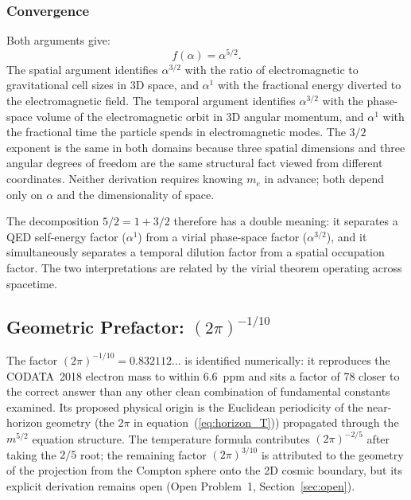 \documentclass[12pt,a4paper]{article}
\begin{document}
\subsubsection*{Convergence}

Both arguments give:
\begin{equation}
\boxed{f(\alpha) = \alpha^{5/2}.}
\label{eq:alpha}
\end{equation}
The spatial argument identifies $\alpha^{3/2}$ with the ratio of electromagnetic
to gravitational cell sizes in 3D space, and $\alpha^1$ with the fractional
energy diverted to the electromagnetic field. The temporal argument identifies
$\alpha^{3/2}$ with the phase-space volume of the electromagnetic orbit in
3D angular momentum, and $\alpha^1$ with the fractional time the particle spends
in electromagnetic modes. The $3/2$ exponent is the same in both domains because
three spatial dimensions and three angular degrees of freedom are the same
structural fact viewed from different coordinates. Neither derivation requires
knowing $m_e$ in advance; both depend only on $\alpha$ and the dimensionality
of space.

The decomposition $5/2 = 1 + 3/2$ therefore has a double meaning: it separates
a QED self-energy factor ($\alpha^1$) from a virial phase-space factor
($\alpha^{3/2}$), and it simultaneously separates a temporal dilution factor
from a spatial occupation factor. The two interpretations are related by the
virial theorem operating across spacetime.

\subsection{Geometric Prefactor: $(2\pi)^{-1/10}$}

The factor $(2\pi)^{-1/10} = 0.832112\ldots$ is identified numerically: it
reproduces the CODATA~2018 electron mass to within 6.6~ppm and sits a factor of
78 closer to the correct answer than any other clean combination of fundamental
constants examined. Its proposed physical origin is the Euclidean periodicity
of the near-horizon geometry (the $2\pi$ in equation~(\ref{eq:horizon_T}))
propagated through the $m^{5/2}$ equation structure. The temperature formula
contributes $(2\pi)^{-2/5}$ after taking the $2/5$ root; the remaining factor
$(2\pi)^{3/10}$ is attributed to the geometry of the projection from the
Compton sphere onto the 2D cosmic boundary, but its explicit derivation remains
open (Open Problem~1, Section~\ref{sec:open}).
\end{document}
